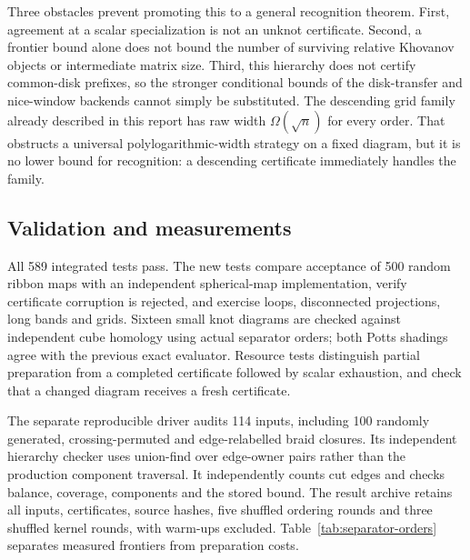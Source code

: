 Three obstacles prevent promoting this to a general recognition theorem.
First, agreement at a scalar specialization is not an unknot certificate.
Second, a frontier bound alone does not bound the number of surviving
relative Khovanov objects or intermediate matrix size.  Third, this hierarchy
does not certify common-disk prefixes, so the stronger conditional bounds of
the disk-transfer and nice-window backends cannot simply be substituted.
The descending grid family already described in this report has raw width
$\Omega(\sqrt n)$ for every order.  That obstructs a universal
polylogarithmic-width strategy on a fixed diagram, but it is no lower bound
for recognition: a descending certificate immediately handles the family.

\subsection{Validation and measurements}

All 589 integrated tests pass.  The new tests compare acceptance of 500 random
ribbon maps with an independent spherical-map implementation, verify
certificate corruption is rejected, and exercise loops, disconnected
projections, long bands and grids.  Sixteen small knot diagrams are checked
against independent cube homology using actual separator orders; both Potts
shadings agree with the previous exact evaluator.  Resource tests distinguish
partial preparation from a completed certificate followed by scalar
exhaustion, and check that a changed diagram receives a fresh certificate.

The separate reproducible driver 
audits 114 inputs, including 100 randomly generated, crossing-permuted and
edge-relabelled braid closures.  Its independent hierarchy checker uses
union-find over edge-owner pairs rather than the production component
traversal.  It independently counts cut edges and checks balance, coverage,
components and the stored bound.  The result archive retains all inputs,
certificates, source hashes, five shuffled ordering rounds and three shuffled
kernel rounds, with warm-ups excluded.  Table~\ref{tab:separator-orders}
separates measured frontiers from preparation costs.

\begin{table}[ht]
\centering\small

\caption{Widths and median order-preparation times. Bounded preparation
includes the separator witness, its verification and the greedy comparison;
these are additional costs, not speedups.}\label{tab:separator-orders}
\end{table}

